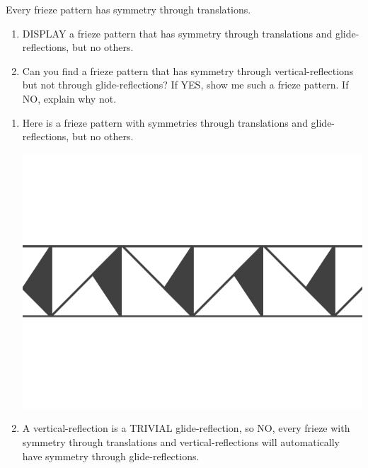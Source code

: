 \documentclass[noauthor,nooutcomes,hints,handout]{ximera}
\begin{document}
\begin{question}
  Every frieze pattern has symmetry through translations.
  \begin{enumerate}
    \item DISPLAY a frieze pattern that has symmetry through
      translations and glide-reflections, but no others.
    \item Can you find a frieze pattern that has symmetry through
      vertical-reflections but not through glide-reflections? If YES,
      show me such a frieze pattern. If NO, explain why not.
  \end{enumerate}
  \begin{freeResponse}
    \begin{enumerate}
      \item Here is a frieze pattern with symmetries through
        translations and glide-reflections, but no others.
        \begin{center}
          \includegraphics[width=.6\textwidth]{ansGR.png}
        \end{center}
      \item A vertical-reflection is a TRIVIAL glide-reflection, so
        NO, every frieze with symmetry through translations and
        vertical-reflections will automatically have symmetry through
        glide-reflections.
    \end{enumerate}
  \end{freeResponse}
\end{question}
\mynewpage
\end{document}
